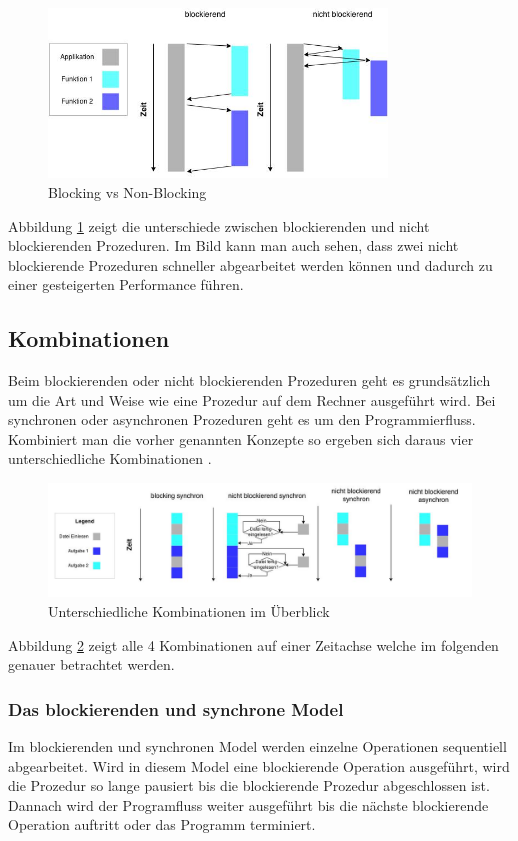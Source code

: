 \begin{figure}[!htb]
  \centering
  \includegraphics[width=9cm]{images/blocking_vs_nonblocking.jpg}
  \caption{
    Blocking vs Non-Blocking
  }
  \label{figure:blocking_vs_non_blocking}
\end{figure}

Abbildung \ref{figure:blocking_vs_non_blocking} zeigt die unterschiede zwischen blockierenden und nicht blockierenden Prozeduren. Im Bild kann man auch sehen, dass zwei nicht blockierende Prozeduren schneller abgearbeitet werden können und dadurch zu einer gesteigerten Performance führen. 

\subsection{Kombinationen}
Beim blockierenden oder nicht blockierenden Prozeduren geht es grundsätzlich um die Art und Weise wie eine Prozedur auf dem Rechner ausgeführt wird. Bei synchronen oder asynchronen Prozeduren geht es um den Programmierfluss. Kombiniert man die vorher genannten Konzepte so ergeben sich daraus vier unterschiedliche Kombinationen \cite[p. 48]{Erb2012}. 

\begin{figure}[!htb]
  \centering
  \includegraphics[width=16cm]{images/synchron_blocking.jpg}
  \caption{
    Unterschiedliche Kombinationen im Überblick
  }
  \label{figure:synchron_blocking}
\end{figure}

Abbildung \ref{figure:synchron_blocking} zeigt alle 4 Kombinationen auf einer Zeitachse welche im folgenden genauer betrachtet werden.

\subsubsection{Das blockierenden und synchrone Model}
Im blockierenden und synchronen Model werden einzelne Operationen sequentiell abgearbeitet. Wird in diesem Model eine blockierende Operation ausgeführt, wird die Prozedur so lange pausiert bis die blockierende Prozedur abgeschlossen ist. Dannach wird der Programfluss weiter ausgeführt bis die nächste blockierende Operation auftritt oder das Programm terminiert.

